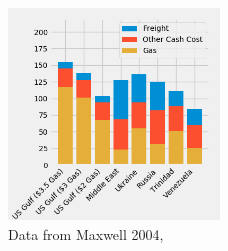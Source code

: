 \begin{figure}
    \centering
    \includegraphics[width=0.5\textwidth]{Figures/Cost_By_location.png}
    \caption{Data from Maxwell 2004\cite{maxwell2004synthetic}, }
    \label{fig:relative_costs}
\end{figure}

